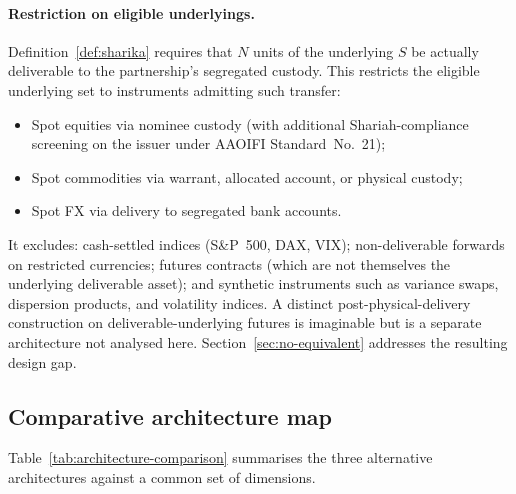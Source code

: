 \documentclass[preprint,12pt,authoryear]{elsarticle}
\theoremstyle{definition}
\begin{document}
\paragraph{Restriction on eligible underlyings.}
Definition~\ref{def:sharika} requires that $N$ units of the
underlying $S$ be actually deliverable to the partnership's
segregated custody. This restricts the eligible underlying set
to instruments admitting such transfer:
\begin{itemize}
    \item Spot equities via nominee custody (with additional
    Shariah-compliance screening on the issuer under AAOIFI
    Standard~No.~21);
    \item Spot commodities via warrant, allocated account, or
    physical custody;
    \item Spot FX via delivery to segregated bank accounts.
\end{itemize}
It excludes: cash-settled indices (S\&P~500, DAX, VIX);
non-deliverable forwards on restricted currencies; futures
contracts (which are not themselves the underlying deliverable
asset); and synthetic instruments such as variance swaps,
dispersion products, and volatility indices. A distinct
post-physical-delivery construction on deliverable-underlying
futures is imaginable but is a separate architecture not analysed
here. Section~\ref{sec:no-equivalent} addresses the resulting
design gap.

\subsection{Comparative architecture map}
\label{sec:arch-comparison}

Table~\ref{tab:architecture-comparison} summarises the three
alternative architectures against a common set of dimensions.
\end{document}
